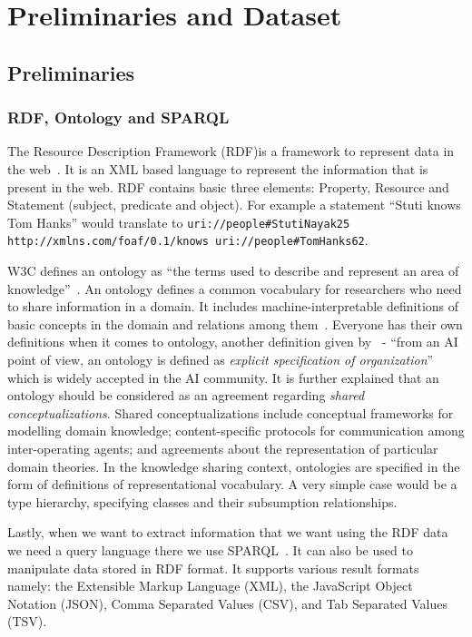 \chapter{Preliminaries and Dataset}\label{chap:method}

\section{Preliminaries}

\subsection{RDF, Ontology and SPARQL}
The Resource Description Framework (RDF)is a framework to represent data in the web~\cite{rdf_framework}. It is an XML based language to represent the information that is present in the web. RDF contains basic three elements: Property, Resource and Statement (subject, predicate and object). For example a statement ``Stuti knows Tom Hanks'' would translate to \texttt{uri://people\#StutiNayak25 http://xmlns.com/foaf/0.1/knows uri://people\#TomHanks62}. 

W3C defines an ontology as “the terms used to describe and represent an area of
knowledge”~\cite{heflin2004owl}. An ontology defines a common vocabulary for researchers who need to share information in a domain. It includes machine-interpretable definitions of basic concepts in the domain and relations among them~\cite{noy2001ontology}. Everyone has their own definitions when it comes to ontology, another definition given by~\cite{gruber1993translation,gruber1995toward} - ``from an AI point of view, an ontology is defined as \emph{explicit specification of organization}'' which is widely accepted in the AI community. It is further explained that an ontology should be considered as an agreement regarding \emph{shared conceptualizations}. Shared conceptualizations include conceptual frameworks for modelling domain knowledge; content-specific protocols for communication among inter-operating agents; and agreements about the representation of particular domain theories. In the knowledge sharing context, ontologies are specified in the form of definitions of representational vocabulary. A very simple case would be a type hierarchy, specifying classes and their subsumption relationships.

Lastly, when we want to extract information that we want using the RDF data we need a query language there we use SPARQL~\cite{harris2013sparql}. It can also be used to manipulate data stored in RDF format. It supports various result formats namely: the Extensible Markup Language (XML), the JavaScript Object Notation (JSON), Comma Separated Values (CSV), and Tab Separated Values (TSV). 




